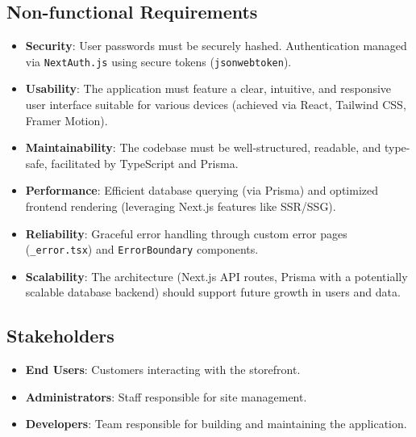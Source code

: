 \documentclass{article}
\begin{document}
\subsection{Non-functional Requirements}
\begin{itemize}[label=\textbullet]
    \item \textbf{Security}: User passwords must be securely hashed. Authentication managed via \texttt{NextAuth.js} using secure tokens (\texttt{jsonwebtoken}).
    \item \textbf{Usability}: The application must feature a clear, intuitive, and responsive user interface suitable for various devices (achieved via React, Tailwind CSS, Framer Motion).
    \item \textbf{Maintainability}: The codebase must be well-structured, readable, and type-safe, facilitated by TypeScript and Prisma.
    \item \textbf{Performance}: Efficient database querying (via Prisma) and optimized frontend rendering (leveraging Next.js features like SSR/SSG).
    \item \textbf{Reliability}: Graceful error handling through custom error pages (\texttt{\_error.tsx}) and \texttt{ErrorBoundary} components.
    \item \textbf{Scalability}: The architecture (Next.js API routes, Prisma with a potentially scalable database backend) should support future growth in users and data.
\end{itemize}

\subsection{Stakeholders}
\begin{itemize}[label=\textbullet]
    \item \textbf{End Users}: Customers interacting with the storefront.
    \item \textbf{Administrators}: Staff responsible for site management.
    \item \textbf{Developers}: Team responsible for building and maintaining the application.
\end{itemize}
\end{document}
